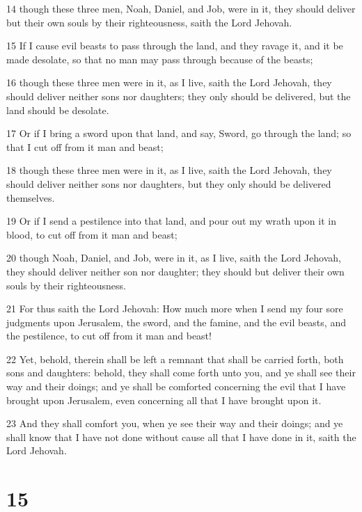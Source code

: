 \par 14 though these three men, Noah, Daniel, and Job, were in it, they should deliver but their own souls by their righteousness, saith the Lord Jehovah.
\par 15 If I cause evil beasts to pass through the land, and they ravage it, and it be made desolate, so that no man may pass through because of the beasts;
\par 16 though these three men were in it, as I live, saith the Lord Jehovah, they should deliver neither sons nor daughters; they only should be delivered, but the land should be desolate.
\par 17 Or if I bring a sword upon that land, and say, Sword, go through the land; so that I cut off from it man and beast;
\par 18 though these three men were in it, as I live, saith the Lord Jehovah, they should deliver neither sons nor daughters, but they only should be delivered themselves.
\par 19 Or if I send a pestilence into that land, and pour out my wrath upon it in blood, to cut off from it man and beast;
\par 20 though Noah, Daniel, and Job, were in it, as I live, saith the Lord Jehovah, they should deliver neither son nor daughter; they should but deliver their own souls by their righteousness.
\par 21 For thus saith the Lord Jehovah: How much more when I send my four sore judgments upon Jerusalem, the sword, and the famine, and the evil beasts, and the pestilence, to cut off from it man and beast!
\par 22 Yet, behold, therein shall be left a remnant that shall be carried forth, both sons and daughters: behold, they shall come forth unto you, and ye shall see their way and their doings; and ye shall be comforted concerning the evil that I have brought upon Jerusalem, even concerning all that I have brought upon it.
\par 23 And they shall comfort you, when ye see their way and their doings; and ye shall know that I have not done without cause all that I have done in it, saith the Lord Jehovah.

\chapter{15}

